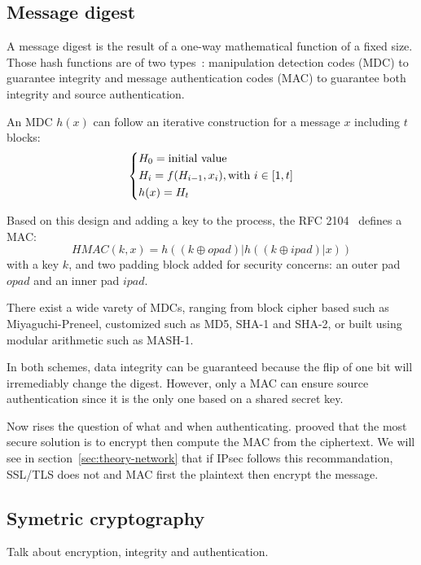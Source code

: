 \subsection{Message digest}
A message digest is the result of a one-way mathematical function of a fixed size.
Those hash functions are of two types~\cite{infof405}: manipulation detection codes (MDC) to guarantee integrity and message authentication codes (MAC) to guarantee both integrity and source authentication.


An MDC $h(x)$ can follow an iterative construction for a message $x$ including $t$ blocks:
\[
\begin{dcases}
	H_0 = \mbox{initial value}\\
	H_i = f(H_{i-1}, x_i), \mbox{with } i \in [1,t]\\
	h(x) = H_t\\
\end{dcases}
\]

Based on this design and adding a key to the process, the RFC 2104~\cite{rfc2104} defines a MAC:
\[
	HMAC(k, x) = h((k\oplus opad)|h((k\oplus ipad)|x))
\]
with a key $k$, and two padding block added for security concerns: an outer pad $opad$ and an inner pad $ipad$.

\noindent There exist a wide varety of MDCs, ranging from block cipher based such as Miyaguchi-Preneel, customized such as MD5, SHA-1 and SHA-2, or built using modular arithmetic such as MASH-1.

In both schemes, data integrity can be guaranteed because the flip of one bit will irremediably change the digest.
However, only a MAC can ensure source authentication since it is the only one based on a shared secret key.

Now rises the question of what and when authenticating.
\citet{Bellare2000} prooved that the most secure solution is to encrypt then compute the MAC from the ciphertext.
We will see in section~\ref{sec:theory-network} that if IPsec follows this recommandation, SSL/TLS does not and MAC first the plaintext then encrypt the message.







\subsection{Symetric cryptography}
Talk about encryption, integrity and authentication.

